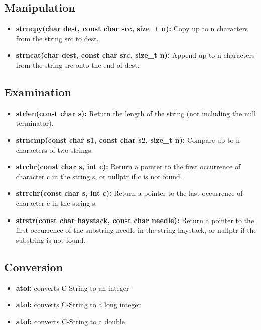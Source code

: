 \documentclass{report}
\begin{document}
    \subsection{Manipulation}
    \begin{itemize}
        \item \textbf{strncpy(char dest, const char src, size\_t n):} Copy up to n characters from the string src to dest.
        \item \textbf{strncat(char dest, const char src, size\_t n):} Append up to n characters from the string src onto the end of dest.
    \end{itemize}

    \bigbreak \noindent 
    \subsection{Examination}
    \begin{itemize}
        \item \textbf{strlen(const char s):} Return the length of the string (not including the null terminator).
        \item \textbf{strncmp(const char s1, const char s2, size\_t n):} Compare up to n characters of two strings.
        \item \textbf{strchr(const char s, int c):} Return a pointer to the first occurrence of character c in the string s, or nullptr if c is not found.
        \item \textbf{strrchr(const char s, int c):} Return a pointer to the last occurrence of character c in the string s.
        \item \textbf{strstr(const char haystack, const char needle):} Return a pointer to the first occurrence of the substring needle in the string haystack, or nullptr if the substring is not found.
    \end{itemize}

    \bigbreak \noindent 
    \subsection{Conversion}
    \begin{itemize}
        \item \textbf{atoi:} converts C-String to an integer 
        \item \textbf{atol:} converts C-String to a long integer 
        \item \textbf{atof:} converts C-String to a double
    \end{itemize}
\end{document}
